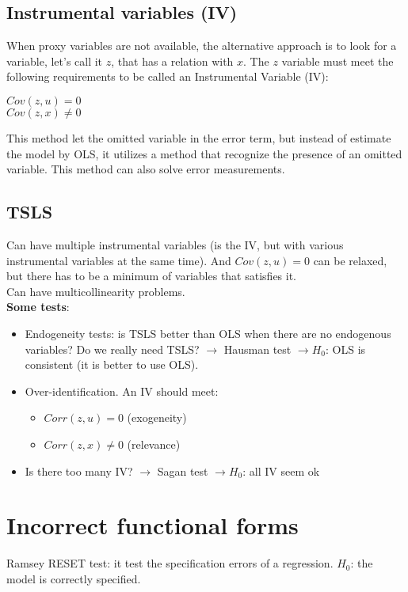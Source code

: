 \documentclass[10pt, a4paper, landscape]{extarticle}
\begin{document}
\begin{multicols}{3}
	\subsection*{Instrumental variables (IV)}
	When proxy variables are not available, the alternative approach is to look for a variable, let's call it $z$, that has a relation with $x$. The $z$ variable must meet the following requirements to be called an Instrumental Variable (IV):
		\begin{center}
			$Cov(z,u) = 0$
			\\ $Cov(z,x) \neq 0$
		\end{center}
	This method let the omitted variable in the error term, but instead of estimate the model by OLS, it utilizes a method that recognize the presence of an omitted variable. This method can also solve error measurements.
	\subsection*{TSLS}
		Can have multiple instrumental variables (is the IV, but with various instrumental variables at the same time). And $Cov(z,u) = 0$ can be relaxed, but there has to be a minimum of variables that satisfies it.
		\\ Can have multicollinearity problems.
		\\ \textbf{Some tests}:
		\begin{itemize}[leftmargin=*]
			\item Endogeneity tests:  is TSLS better than OLS when there are no endogenous variables? Do we really need TSLS? $\rightarrow$ Hausman test $\rightarrow H_0$: OLS is consistent (it is better to use OLS).
			\item Over-identification. An IV should meet:
			\begin{itemize}[leftmargin=*]
				\item $Corr(z,u) = 0$ (exogeneity)
				\item $Corr(z,x) \neq 0$ (relevance)
			\end{itemize}
			\item Is there too many IV? $\rightarrow$ Sagan test $\rightarrow H_0$: all IV seem ok
		\end{itemize}
	
\columnbreak


\section*{Incorrect functional forms}
	Ramsey RESET test: it test the specification errors of a regression. $H_0$: the model is correctly specified.


\end{multicols}
\end{document}
